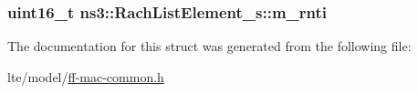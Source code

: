 \subsubsection[{\texorpdfstring{m\+\_\+rnti}{m_rnti}}]{\setlength{\rightskip}{0pt plus 5cm}uint16\+\_\+t ns3\+::\+Rach\+List\+Element\+\_\+s\+::m\+\_\+rnti}\hypertarget{structns3_1_1RachListElement__s_ad4442cd0ac19944b32a86cc7338f59bd}{}\label{structns3_1_1RachListElement__s_ad4442cd0ac19944b32a86cc7338f59bd}


The documentation for this struct was generated from the following file\+:\begin{DoxyCompactItemize}
\item 
lte/model/\hyperlink{ff-mac-common_8h}{ff-\/mac-\/common.\+h}\end{DoxyCompactItemize}
